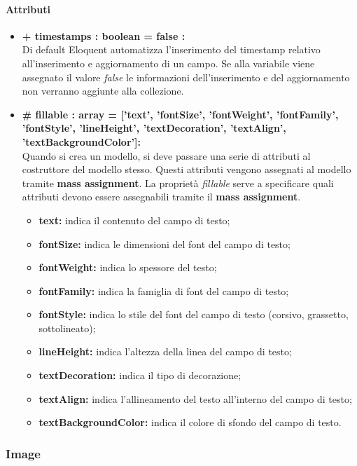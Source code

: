 	\paragraph{Attributi}
	\begin{itemize}
		\item \textbf{+ timestamps : boolean = false :}\\
		Di default Eloquent automatizza l'inserimento del timestamp relativo all'inserimento e aggiornamento di un campo. Se alla variabile viene assegnato il valore \textit{false} le informazioni dell'inserimento e del aggiornamento non verranno aggiunte alla collezione.
		\item \textbf{\# fillable : array = [’text’, ’fontSize’, ’fontWeight’, ’fontFamily’, ’fontStyle’, ’lineHeight’, ’textDecoration’, ’textAlign’, ’textBackgroundColor']:}\\
		Quando si crea un modello, si deve passare una serie di attributi al costruttore del modello stesso. Questi attributi vengono assegnati al modello tramite \textbf{mass assignment}. La proprietà \textit{fillable} serve a specificare quali attributi devono essere assegnabili tramite il \textbf{mass assignment}.
		\begin{itemize}
			\item \textbf{text:} indica il contenuto del campo di testo;
			\item \textbf{fontSize:} indica le dimensioni del \gls{font} del campo di testo;
			\item \textbf{fontWeight:} indica lo spessore del testo;
			\item \textbf{fontFamily:} indica la famiglia di \gls{font} del campo di testo;
			\item \textbf{fontStyle:} indica lo stile del \gls{font} del campo di testo (corsivo, grassetto, sottolineato);
			\item \textbf{lineHeight:} indica l'altezza della linea del campo di testo;
			\item \textbf{textDecoration:} indica il tipo di decorazione;
			\item \textbf{textAlign:} indica l'allineamento del testo all'interno del campo di testo;
			\item \textbf{textBackgroundColor:} indica il colore di sfondo del campo di testo.
		\end{itemize}
	\end{itemize}
\newpage


\subsubsection{Image}

